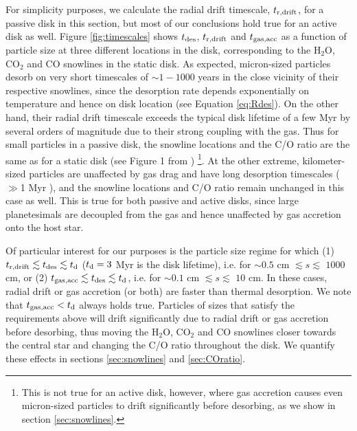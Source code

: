 \documentclass[apj]{emulateapj}
\newcommand{\emgr}[1]{\emph{ \color{gray} #1}}
\begin{document}
For simplicity purposes, we calculate the radial drift timescale, $t_{\rm r, drift}$, for a passive disk in this section, but most of our conclusions hold true for an active disk as well. Figure \ref{fig:timescales} shows $t_{\rm des}$, $t_{\rm r, drift}$ and $t_{\rm gas, acc}$ as a function of particle size at three different locations in the disk, corresponding to the H$_2$O, CO$_2$ and CO snowlines in the static disk. As expected, micron-sized particles desorb on very short timescales of $\sim 1-1000$ years in the close vicinity of their respective snowlines, since the desorption rate depends exponentially on temperature and hence on disk location (see Equation \ref{eq:Rdes}).  On the other hand, their radial drift timescale exceeds the typical disk lifetime of a few Myr by several orders of magnitude due to their strong coupling with the gas. Thus for small particles in a passive disk, the snowline locations and the C/O ratio are the same as for a static disk (see Figure 1 from \citealt{oberg11}) \footnote{This is not true for an active disk, however, where gas accretion causes even micron-sized particles to drift significantly before desorbing, as we show in section \ref{sec:snowlines}.}. At the other extreme, kilometer-sized particles are unaffected by gas drag and have long desorption timescales ($\gg$1 Myr ), and the snowline locations and C/O ratio remain unchanged in this case as well. This is true for both passive and active disks, since large planetesimals are decoupled from the gas and hence unaffected by gas accretion onto the host star. 

Of particular interest for our purposes is the particle size regime for which (1) $t_{\rm r, drift} \lesssim t_{\rm des} \lesssim t_{\rm d}$ ($t_{\rm d}=3$ Myr is the disk lifetime), i.e. for $\sim$$0.5$ cm $\lesssim s \lesssim$ $1000$ cm, or (2) $t_{\rm gas, acc} \lesssim t_{\rm des} \lesssim t_{\rm d}$, i.e. for $\sim$$0.1$ cm $\lesssim s \lesssim$ $10$ cm. In these cases, radial drift or gas accretion (or both) are faster than thermal desorption. We note that $t_{\rm gas, acc}<t_{\rm d}$ always holds true. Particles of sizes that satisfy the requirements above will drift significantly due to radial drift or gas accretion before desorbing, thus moving the H$_2$O, CO$_2$ and CO snowlines closer towards the central star and changing the C/O ratio throughout the disk. We quantify these effects in sections \ref{sec:snowlines} and \ref{sec:COratio}.



\end{document}

